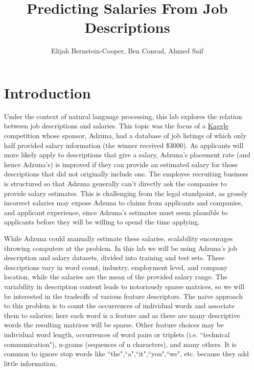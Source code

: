 \documentclass[12pt]{article}
\begin{document}
\title{Predicting Salaries From Job Descriptions}

\author{
Elijah Bernstein-Cooper, Ben Conrad, Ahmed Saif
}
\maketitle



\section{Introduction}

    Under the context of natural language processing, this lab explores the
    relation between job descriptions and salaries.  This topic was the focus
    of a \href{http://www.kaggle.com/c/job-salary-prediction}{Kaggle}
    competition whose sponsor, Adzuna, had a database of job listings of which
    only half provided salary information (the winner received \$3000).  As
    applicants will more likely apply to descriptions that give a salary,
    Adzuna's placement rate (and hence Adzuna's) is improved if they can provide
    an estimated salary for those descriptions that did not originally include
    one. The employee recruiting business is structured so that Adzuna
    generally can't directly ask the companies to provide salary estimates.
    This is challenging from the legal standpoint, as grossly incorrect	
    salaries may expose Adzuna to claims from applicants and companies, and
    applicant experience, since Adzuna's estimates must seem plausible to
    applicants before they will be willing to spend the time applying.

    While Adzuna could manually estimate these salaries, scalability encourages
    throwing computers at the problem.  In this lab we will be using Adzuna's
    job description and salary datasets, divided into training and test sets.
    These descriptions vary in word count, industry, employment level, and
    company location, while the salaries are the mean of the provided salary
    range.  The variability in description content leads to notoriously sparse
    matrices, so we will be interested in the tradeoffs of various feature
    descriptors.  The naive approach to this problem is to count the
    occurrences of individual words and associate them to salaries; here each
    word is a feature and as there are many descriptive words the resulting
    matrices will be sparse.  Other feature choices may be individual word
    length, occurrences of word pairs or triplets (i.e. ``technical
    communication"), n-grams (sequences of n characters), and many others. It
    is common to ignore stop words like ``the",``a",``it",``you",``we", etc.
    because they add little information.
\end{document}
